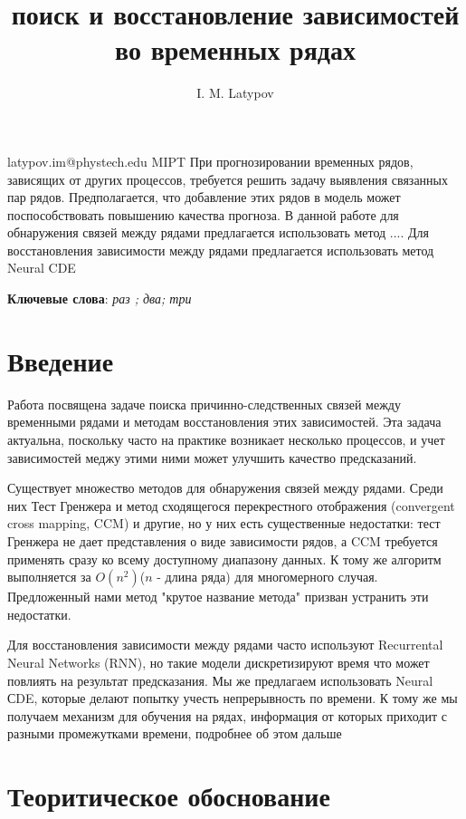 \documentclass[12pt, twoside]{article}
\begin{document}
\title
	[поиск и восстановление зависимостей во временных рядах]
	{поиск и восстановление зависимостей во временных рядах}
\author
	[I. M. Latypov]
	{I. M. Latypov}
\email
	{latypov.im@phystech.edu}
\organization	
	{MIPT}	
\abstract
	{
		При прогнозировании временных рядов, зависящих от других процессов, требуется решить задачу выявления связанных пар рядов.
		Предполагается, что добавление этих рядов в модель может поспособствовать повышению качества прогноза. В данной работе для
		обнаружения связей между рядами предлагается использовать метод .... Для восстановления зависимости между рядами предлагается
		использовать метод Neural CDE
		}
\bigskip
\noindent

\maketitle
\textbf{Ключевые слова}: \emph{раз ; два; три }

\section{Введение}
	Работа посвящена задаче поиска причинно-следственных связей между временными рядами и методам восстановления этих зависимостей.
	Эта задача актуальна, поскольку часто на практике возникает несколько процессов, и учет зависимостей меджу этими ними может улучшить качество предсказаний. 
		
	Существует множество методов для обнаружения связей между рядами. Среди них Тест Гренжера и метод сходящегося перекрестного отображения
	(convergent cross mapping, CCM) и другие, но у них есть существенные недостатки: тест Гренжера не дает
	представления о виде зависимости рядов, а CCM требуется применять сразу ко всему доступному диапазону данных. К тому же алгоритм
	выполняется за $O(n^2)$($n$ - длина ряда) для многомерного случая. Предложенный нами метод "крутое название метода" призван устранить эти недостатки.
	
	Для восстановления зависимости между рядами часто используют Recurrental Neural Networks (RNN), но такие модели дискретизируют время
	что может повлиять на результат предсказания. Мы же предлагаем использовать Neural СDE, которые делают попытку учесть непрерывность
	по времени. К тому же мы получаем механизм для обучения на рядах, информация от которых приходит с разными промежутками времени, подробнее об этом дальше
    

\section{Теоритическое обоснование}
	
	
	
	
\end{document}
